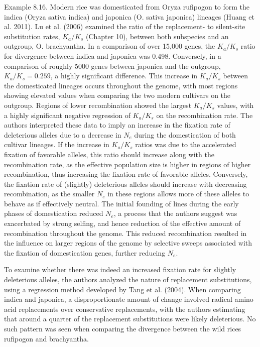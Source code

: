 \documentclass{article}
\begin{document}
Example 8.16. Modern rice was domesticated from Oryza rufipogon to form the indica (Oryza sativa indica) and japonica (O. sativa japonica) lineages (Huang et al. 2011). Lu et al. (2006) examined the ratio of the replacement- to silent-site substitution rates,  $ K_a / K_s $ (Chapter 10), between both subspecies and an outgroup, O. brachyantha. In a comparison of over 15,000 genes, the  $ K_a / K_s $ ratio for divergence between indica and japonica was 0.498. Conversely, in a comparison of roughly 5000 genes between japonica and the outgroup,  $ K_a / K_s = 0.259 $, a highly significant difference. This increase in  $ K_a / K_s $ between the domesticated lineages occurs throughout the genome, with most regions showing elevated values when comparing the two modern cultivars on the outgroup. Regions of lower recombination showed the largest  $ K_a / K_s $ values, with a highly significant negative regression of  $ K_a / K_s $ on the recombination rate. The authors interpreted these data to imply an increase in the fixation rate of deleterious alleles due to a decrease in  $ N_e $ during the domestication of both cultivar lineages. If the increase in  $ K_a / K_s $ ratios was due to the accelerated fixation of favorable alleles, this ratio should increase along with the recombination rate, as the effective population size is higher in regions of higher recombination, thus increasing the fixation rate of favorable alleles. Conversely, the fixation rate of (slightly) deleterious alleles should increase with decreasing recombination, as the smaller  $ N_e $ in these regions allows more of these alleles to behave as if effectively neutral. The initial founding of lines during the early phases of domestication reduced  $ N_e $, a process that the authors suggest was exacerbated by strong selfing, and hence reduction of the effective amount of recombination throughout the genome. This reduced recombination resulted in the influence on larger regions of the genome by selective sweeps associated with the fixation of domestication genes, further reducing  $ N_e $.

To examine whether there was indeed an increased fixation rate for slightly deleterious alleles, the authors analyzed the nature of replacement substitutions, using a regression method developed by Tang et al. (2004). When comparing indica and japonica, a disproportionate amount of change involved radical amino acid replacements over conservative replacements, with the authors estimating that around a quarter of the replacement substitutions were likely deleterious. No such pattern was seen when comparing the divergence between the wild rices rufipogon and brachyantha.
\end{document}

